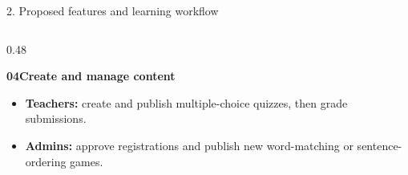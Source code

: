 \documentclass[10pt,t,aspectratio=169]{beamer}
\newenvironment{topicblock}[1]{%
  \par\vspace{0.12cm}%
  {\normalsize\bfseries\color{hustprimary}#1}\par\vspace{-0.08cm}%
}{\par}
\begin{document}
\begin{frame}{2. Proposed features and learning workflow}
\begin{columns}[T,onlytextwidth]
\begin{column}{0.48\textwidth}
      \begin{topicblock}{04\quad Create and manage content}
        \small
        \begin{itemize}
          \setlength{\itemsep}{0.2em}
          \setlength{\parsep}{0pt}
          \item \textbf{Teachers:} create and publish multiple-choice quizzes, then grade submissions.
          \item \textbf{Admins:} approve registrations and publish new word-matching or sentence-ordering games.
        \end{itemize}
      \end{topicblock}
    \end{column}
  \end{columns}
\end{frame}
\end{document}
